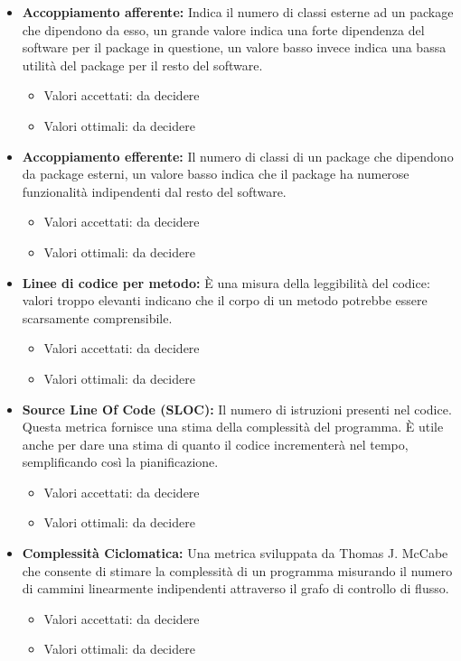 \documentclass[a4paper]{article}
\begin{document}
\begin{itemize}
					\item \textbf{Accoppiamento afferente:}
						Indica il numero di classi esterne ad un package che dipendono da esso, un grande valore indica una forte 
						dipendenza del software per il package in questione, un valore basso invece indica una bassa utilità del 
						package per il resto del software.
						\begin{itemize}
							\item Valori accettati: da decidere
							\item Valori ottimali: da decidere
						\end{itemize}

					\item \textbf{Accoppiamento efferente:}
						Il numero di classi di un package che dipendono da package esterni, un valore basso indica che il package ha 
						numerose funzionalità indipendenti dal resto del software.
						\begin{itemize}
							\item Valori accettati: da decidere
							\item Valori ottimali: da decidere
						\end{itemize}
						
					\item \textbf{Linee di codice per metodo:}
						È una misura della leggibilità del codice: valori troppo elevanti indicano che il corpo di un metodo
						potrebbe essere scarsamente comprensibile.
						\begin{itemize}
							\item Valori accettati: da decidere
							\item Valori ottimali: da decidere
						\end{itemize}
						
					\item \textbf{Source Line Of Code (SLOC):}
						Il numero di istruzioni presenti nel codice. Questa metrica fornisce una stima della complessità del programma.
						È utile anche per dare una stima di quanto il codice incrementerà nel tempo, semplificando così la
						pianificazione.
						\begin{itemize}
							\item Valori accettati: da decidere
							\item Valori ottimali: da decidere
						\end{itemize}
					
					\item \textbf{Complessità Ciclomatica:}
						Una metrica sviluppata da Thomas J. McCabe che consente di stimare la complessità di un programma misurando
						il numero di cammini linearmente indipendenti attraverso il grafo di controllo di flusso.
						\begin{itemize}
							\item Valori accettati: da decidere
							\item Valori ottimali: da decidere
						\end{itemize}
					
					
					
			\end{itemize}
			
\end{document}
